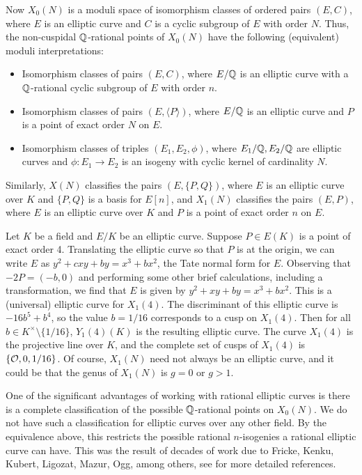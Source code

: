Now $X_0(N)$ is a moduli space of isomorphism classes of ordered pairs $(E,C)$, where $E$ is an elliptic curve and $C$ is a cyclic subgroup of $E$ with order $N$. Thus, the non-cuspidal $\mathbb{Q}$-rational points of $X_0(N)$ have the following (equivalent) moduli interpretations:
	\begin{itemize} \itemsep-1em
	\item Isomorphism classes of pairs $(E,C)$, where $E/\mathbb{Q}$ is an elliptic curve with a $\mathbb{Q}$-rational cyclic subgroup of $E$ with order $n$.
	\item Isomorphism classes of pairs $(E, \langle P \rangle)$, where $E/\mathbb{Q}$ is an elliptic curve and $P$ is a point of exact order $N$ on $E$.
	\item Isomorphism classes of triples $(E_1,E_2,\phi)$, where $E_1/\mathbb{Q}, E_2/\mathbb{Q}$ are elliptic curves and $\phi: E_1 \to E_2$ is an isogeny with cyclic kernel of cardinality $N$. 
	\end{itemize}
Similarly, $X(N)$ classifies the pairs $(E, \{ P, Q \})$, where $E$ is an elliptic curve over $K$ and $\{ P, Q \}$ is a basis for $E[n]$, and $X_1(N)$ classifies the pairs $(E,P)$, where $E$ is an elliptic curve over $K$ and $P$ is a point of exact order $n$ on $E$. 


\begin{ex}
Let $K$ be a field and $E/K$ be an elliptic curve. Suppose $P \in E(K)$ is a point of exact order 4. Translating the elliptic curve so that $P$ is at the origin, we can write $E$ as $y^2 + cxy + by= x^3 + bx^2$, the Tate normal form for $E$. Observing that $-2P= (-b, 0)$ and performing some other brief calculations, including a transformation, we find that $E$ is given by $y^2 + xy + by= x^3 + bx^2$. This is a (universal) elliptic curve for $X_1(4)$. The discriminant of this elliptic curve is $-16b^5 + b^4$, so the value $b= 1/16$ corresponds to a cusp on $X_1(4)$. Then for all $b \in K^\times \setminus \{1/16\}$, $Y_1(4)(K)$ is the resulting elliptic curve. The curve $X_1(4)$ is the projective line over $K$, and the complete set of cusps of $X_1(4)$ is $\{ \mathcal{O}, 0, 1/16 \}$. Of course, $X_1(N)$ need not always be an elliptic curve, and it could be that the genus of $X_1(N)$ is $g= 0$ or $g > 1$. 
\end{ex}


One of the significant advantages of working with rational elliptic curves is there is a complete classification of the possible $\mathbb{Q}$-rational points on $X_0(N)$. We do not have such a classification for elliptic curves over any other field. By the equivalence above, this restricts the possible rational $n$-isogenies a rational elliptic curve can have. This was the result of decades of work due to Fricke, Kenku, Kubert, Ligozat, Mazur, Ogg, among others, see \cite{lozanorobledo13} for more detailed references. 



